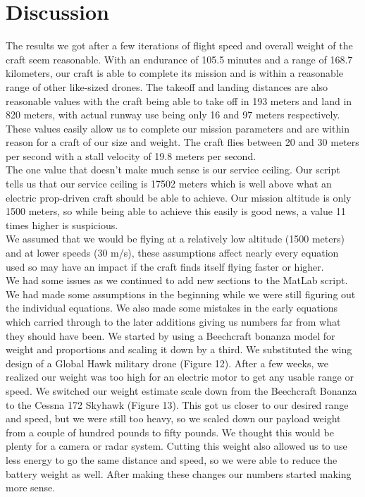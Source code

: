 \documentclass[12pt,A4paper]{article}
\begin{document}
	\section{Discussion}
	 \hspace{.15 in}The results we got after a few iterations of flight speed and overall weight of the craft seem reasonable. With an endurance of 105.5 minutes and a range of 168.7 kilometers, our craft is able to complete its mission and is within a reasonable range of other like-sized drones. The takeoff and landing distances are also reasonable values with the craft being able to take off in 193 meters and land in 820 meters, with actual runway use being only 16 and 97 meters respectively. These values easily allow us to complete our mission parameters and are within reason for a craft of our size and weight. The craft flies between 20 and 30 meters per second with a stall velocity of 19.8 meters per second. \\
	\indent The one value that doesn’t make much sense is our service ceiling. Our script tells us that our service ceiling is 17502 meters which is well above what an electric prop-driven craft should be able to achieve. Our mission altitude is only 1500 meters, so while being able to achieve this easily is good news, a value 11 times higher is suspicious. \\
	\indent We assumed that we would be flying at a relatively low altitude (1500 meters) and at lower speeds (30 m/s), these assumptions affect nearly every equation used so may have an impact if the craft finds itself flying faster or higher. \\
	\indent We had some issues as we continued to add new sections to the MatLab script. We had made some assumptions in the beginning while we were still figuring out the individual equations. We also made some mistakes in the early equations which carried through to the later additions giving us numbers far from what they should have been. 
	We started by using a Beechcraft bonanza model for weight and proportions and scaling it down by a third. We substituted the wing design of a Global Hawk military drone (Figure 12). After a few weeks, we realized our weight was too high for an electric motor to get any usable range or speed. We switched our weight estimate scale down from the Beechcraft Bonanza to the Cessna 172 Skyhawk (Figure 13). This got us closer to our desired range and speed, but we were still too heavy, so we scaled down our payload weight from a couple of hundred pounds to fifty pounds. We thought this would be plenty for a camera or radar system. Cutting this weight also allowed us to use less energy to go the same distance and speed, so we were able to reduce the battery weight as well. After making these changes our numbers started making more sense. 
	
\end{document}
